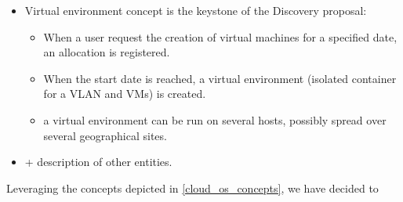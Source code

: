 \begin{itemize}
	\item Virtual environment concept is the keystone of the Discovery proposal:
		
		\begin{itemize}

			\item When a user request the creation of virtual machines for a specified date, an allocation is registered.

			\item When the start date is reached, a virtual environment (isolated container for a VLAN and VMs) is created.

			\item a virtual environment can be run on several hosts, possibly spread over several geographical sites.

		\end{itemize}

	\item + description of other entities.

\end{itemize}


Leveraging the concepts depicted in \ref{cloud_os_concepts}, we have decided to



 
